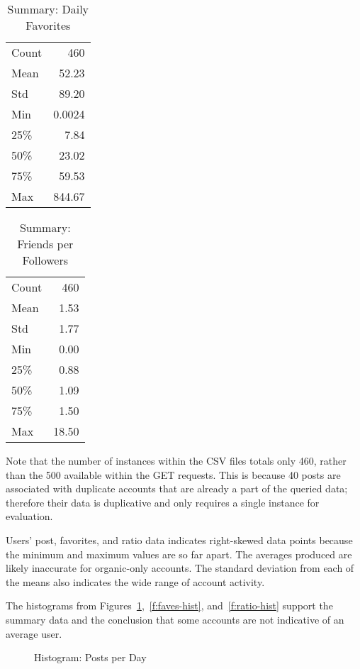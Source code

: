 \begin{table}[htb]
\centering
\caption{Summary: Daily Favorites}
\label{t:faves-summary}
\begin{tabular}{lr}
Count & 460  \\
Mean  & 52.23  \\
Std   & 89.20  \\
Min   & 0.0024 \\
25\%  & 7.84   \\
50\%  & 23.02  \\
75\%  & 59.53  \\
Max   & 844.67
\end{tabular}
\end{table}

\begin{table}[htb]
\centering
\caption{Summary: Friends per Followers}
\label{t:ratio-summary}
\begin{tabular}{lr}
Count & 460 \\
Mean  & 1.53   \\
Std   & 1.77   \\
Min   & 0.00   \\
25\%  & 0.88   \\
50\%  & 1.09   \\
75\%  & 1.50   \\
Max   & 18.50 
\end{tabular}
\end{table}

Note that the number of instances within the CSV files totals only 460, rather
than the 500 available within the GET requests. This is because 40 posts are
associated with duplicate accounts that are already a part of the queried data;
therefore their data is duplicative and only requires a single instance for
evaluation. 

Users' post, favorites, and ratio data indicates right-skewed data points
because the minimum and maximum values are so far apart. The averages produced
are likely inaccurate for organic-only accounts. The standard deviation from
each of the means also indicates the wide range of account activity.

The histograms from Figures~\ref{f:post-hist},~\ref{f:faves-hist},
and~\ref{f:ratio-hist} support the summary data and the conclusion that some
accounts are not indicative of an average user.

\begin{figure}[!ht]
  \centering
  \caption{Histogram: Posts per Day}\label{f:post-hist}
\end{figure}

